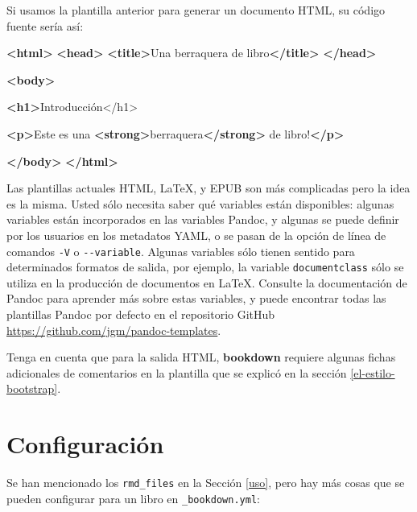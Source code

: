 \documentclass[12pt,]{krantz}
\makeatletter
\newenvironment{Shaded}{\begin{snugshade}}{\end{snugshade}}
\newcommand{\KeywordTok}[1]{\textcolor[rgb]{0.13,0.29,0.53}{\textbf{#1}}}
\newcommand{\NormalTok}[1]{#1}
\newenvironment{kframe}{%
\medskip{}
\setlength{\fboxsep}{.8em}
 \def\at@end@of@kframe{}%
 \ifinner\ifhmode%
  \def\at@end@of@kframe{\end{minipage}}%
  \begin{minipage}{\columnwidth}%
 \fi\fi%
 \def\FrameCommand##1{\hskip\@totalleftmargin \hskip-\fboxsep
 \colorbox{shadecolor}{##1}\hskip-\fboxsep
     \hskip-\linewidth \hskip-\@totalleftmargin \hskip\columnwidth}%
 \MakeFramed {\advance\hsize-\width
   \@totalleftmargin\z@ \linewidth\hsize
   \@setminipage}}%
 {\par\unskip\endMakeFramed%
 \at@end@of@kframe}
\renewenvironment{Shaded}{\begin{kframe}}{\end{kframe}}
\theoremstyle{definition}
\theoremstyle{definition}
\theoremstyle{definition}
\theoremstyle{remark}
\makeatother
\begin{document}
Si usamos la plantilla anterior para generar un documento HTML, su
código fuente sería así:

\begin{Shaded}
\begin{Highlighting}[]
\KeywordTok{<html>}
  \KeywordTok{<head>}
    \KeywordTok{<title>}\NormalTok{Una berraquera de libro}\KeywordTok{</title>}
  \KeywordTok{</head>}
  
  \KeywordTok{<body>}
  
  \KeywordTok{<h1>}\NormalTok{Introducción</h1>}
  
  \KeywordTok{<p>}\NormalTok{Este es una }\KeywordTok{<strong>}\NormalTok{berraquera}\KeywordTok{</strong>}\NormalTok{ de libro!}\KeywordTok{</p>}
  
  \KeywordTok{</body>}
\KeywordTok{</html>}
\end{Highlighting}
\end{Shaded}

Las plantillas actuales HTML, LaTeX, y EPUB son más complicadas pero la
idea es la misma. Usted sólo necesita saber qué variables están
disponibles: algunas variables están incorporados en las variables
Pandoc, y algunas se puede definir por los usuarios en los metadatos
YAML, o se pasan de la opción de línea de comandos \texttt{-V} o
\texttt{-\/-variable}. Algunas variables sólo tienen sentido para
determinados formatos de salida, por ejemplo, la variable
\texttt{documentclass} sólo se utiliza en la producción de documentos en
LaTeX. Consulte la documentación de Pandoc para aprender más sobre estas
variables, y puede encontrar todas las plantillas Pandoc por defecto en
el repositorio GitHub \url{https://github.com/jgm/pandoc-templates}.

Tenga en cuenta que para la salida HTML, \textbf{bookdown} requiere
algunas fichas adicionales de comentarios en la plantilla que se explicó
en la sección \ref{el-estilo-bootstrap}.

\section{Configuración}\label{configuracion}

Se han mencionado los \texttt{rmd\_files} en la Sección \ref{uso}, pero
hay más cosas que se pueden configurar para un libro en
\texttt{\_bookdown.yml}:
\end{document}
